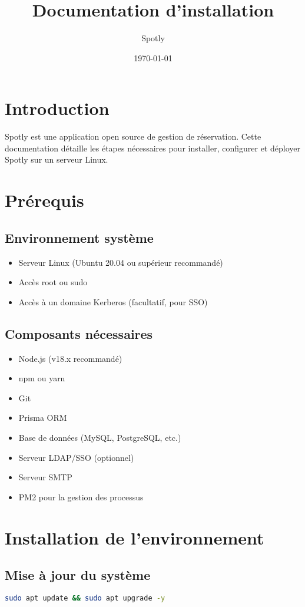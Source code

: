 \documentclass[a4paper,12pt]{article}
\title{Documentation d'installation}
\author{Spotly}
\date{\today}
\begin{document}
\maketitle
\tableofcontents

\section{Introduction}
Spotly est une application open source de gestion de réservation. Cette documentation détaille les étapes nécessaires pour installer, configurer et déployer Spotly sur un serveur Linux.

\section{Prérequis}
\subsection{Environnement système}
\begin{itemize}
    \item Serveur Linux (Ubuntu 20.04 ou supérieur recommandé)
    \item Accès root ou sudo
    \item Accès à un domaine Kerberos (facultatif, pour SSO)
\end{itemize}

\subsection{Composants nécessaires}
\begin{itemize}
    \item Node.js (v18.x recommandé)
    \item npm ou yarn
    \item Git
    \item Prisma ORM
    \item Base de données (MySQL, PostgreSQL, etc.)
    \item Serveur LDAP/SSO (optionnel)
    \item Serveur SMTP
    \item PM2 pour la gestion des processus
\end{itemize}

\section{Installation de l'environnement}
\subsection{Mise à jour du système}
\begin{lstlisting}[language=bash]
sudo apt update && sudo apt upgrade -y
\end{lstlisting}
\end{document}
